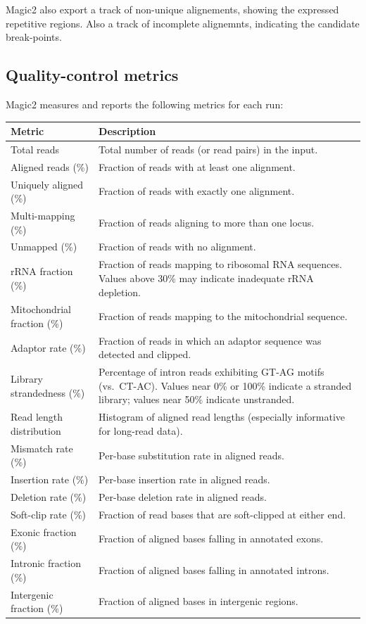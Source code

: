 \documentclass[11pt]{article}
\begin{document}
Magic2 also export a track of non-unique alignements, showing the
expressed repetitive regions. Also a track of incomplete alignemnts, indicating
the candidate break-points.

\subsection{Quality-control metrics}

Magic2 measures and reports the following metrics for each run:

\begin{center}
\begin{longtable}{p{4.5cm} p{9cm}}
\toprule
\textbf{Metric} & \textbf{Description} \\
\midrule
\endhead
Total reads              & Total number of reads (or read pairs) in the input. \\
Aligned reads (\%)       & Fraction of reads with at least one alignment. \\
Uniquely aligned (\%)    & Fraction of reads with exactly one alignment. \\
Multi-mapping (\%)       & Fraction of reads aligning to more than one locus. \\
Unmapped (\%)            & Fraction of reads with no alignment. \\
rRNA fraction (\%)       & Fraction of reads mapping to ribosomal RNA sequences.
                           Values above 30\% may indicate inadequate rRNA depletion. \\
Mitochondrial fraction (\%) & Fraction of reads mapping to the mitochondrial sequence. \\
Adaptor rate (\%)        & Fraction of reads in which an adaptor sequence was
                           detected and clipped. \\
Library strandedness (\%)& Percentage of intron reads exhibiting GT-AG motifs
                           (vs.\ CT-AC).  Values near 0\% or 100\% indicate a
                           stranded library; values near 50\% indicate unstranded. \\
Read length distribution & Histogram of aligned read lengths (especially
                           informative for long-read data). \\
Mismatch rate (\%)       & Per-base substitution rate in aligned reads. \\
Insertion rate (\%)      & Per-base insertion rate in aligned reads. \\
Deletion rate (\%)       & Per-base deletion rate in aligned reads. \\
Soft-clip rate (\%)      & Fraction of read bases that are soft-clipped at either end. \\
Exonic fraction (\%)     & Fraction of aligned bases falling in annotated exons. \\
Intronic fraction (\%)   & Fraction of aligned bases falling in annotated introns. \\
Intergenic fraction (\%) & Fraction of aligned bases in intergenic regions. \\
\bottomrule
\end{longtable}
\end{center}
\end{document}
